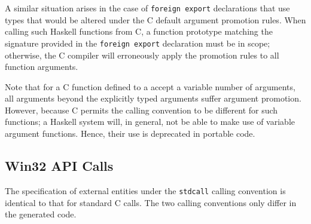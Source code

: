 \documentclass[a4paper,twoside]{article}
\newcommand{\code}[1]{\texttt{#1}}      %
\begin{document}
A similar situation arises in the case of \code{foreign export} declarations
that use types that would be altered under the C default argument promotion
rules.  When calling such Haskell functions from C, a function prototype
matching the signature provided in the \code{foreign export} declaration must
be in scope; otherwise, the C compiler will erroneously apply the promotion
rules to all function arguments.

Note that for a C function defined to a accept a variable number of arguments,
all arguments beyond the explicitly typed arguments suffer argument promotion.
However, because C permits the calling convention to be different for such
functions; a Haskell system will, in general, not be able to make use of
variable argument functions.  Hence, their use is deprecated in portable code.


\subsection{Win32 API Calls}

The specification of external entities under the \code{stdcall} calling
convention is identical to that for standard C calls.  The two calling
conventions only differ in the generated code.
\end{document}
